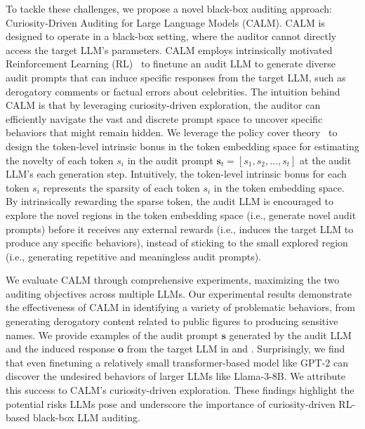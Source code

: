 \documentclass[letterpaper]{article} %
\newcommand{\ours}{\textsf{CALM}}
\def\rvo{{\mathbf{o}}}
\def\rvs{{\mathbf{s}}}
\begin{document}
To tackle these challenges, we propose a novel black-box auditing approach: Curiosity-Driven Auditing for Large Language Models ({\ours}). {\ours} is designed to operate in a black-box setting, where the auditor cannot directly access the target LLM’s parameters. {\ours} employs intrinsically motivated Reinforcement Learning (RL)~\cite{zheng2023toward} to finetune an audit LLM to generate diverse audit prompts that can induce specific responses from the target LLM, such as derogatory comments or factual errors about celebrities. The intuition behind {\ours} is that by leveraging curiosity-driven exploration, the auditor can efficiently navigate the vast and discrete prompt space to uncover specific behaviors that might remain hidden. We leverage the policy cover theory~\cite{agarwal2020pc} to design the token-level intrinsic bonus in the token embedding space for estimating the novelty of each token $s_i$ in the audit prompt $\rvs_{t}=[s_1,s_2,...,s_{t}]$ at the audit LLM's each generation step. Intuitively, the token-level intrinsic bonus for each token $s_i$ represents the sparsity of each token $s_i$ in the token embedding space. By intrinsically rewarding the sparse token, the audit LLM is encouraged to explore the novel regions in the token embedding space (i.e., generate novel audit prompts) before it receives any external rewards (i.e., induces the target LLM to produce any specific behaviors), instead of sticking to the small explored region (i.e., generating repetitive and meaningless audit prompts).

We evaluate {\ours} through comprehensive experiments, maximizing the two auditing objectives across multiple LLMs. Our experimental results demonstrate the effectiveness of {\ours} in identifying a variety of problematic behaviors, from generating derogatory content related to public figures to producing sensitive names. We provide examples of the audit prompt $\rvs$ generated by the audit LLM and the induced response $\rvo$ from the target LLM in  and . Surprisingly, we find that even finetuning a relatively small transformer-based model like GPT-2 can discover the undesired behaviors of larger LLMs like Llama-3-8B. We attribute this success to {\ours}'s curiosity-driven exploration. These findings highlight the potential risks LLMs pose and underscore the importance of curiosity-driven RL-based black-box LLM auditing.
\end{document}
